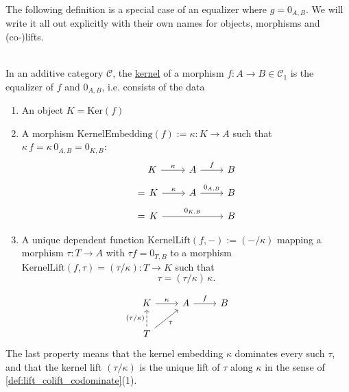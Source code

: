 The following definition is a special case of an equalizer where $g = 0_{A,B}$. We will write it all out explicitly with their
own names for objects, morphisms and (co-)lifts.

\begin{definition}[Kernel]\label{def:kernel}\phantom{}\\
In an additive category $\mathcal{C}$, the \ul{kernel} of a morphism $f : A \rightarrow B \in \mathcal{C}_{1}$ is the equalizer
of $f$ and $0_{A,B}$, i.e. consists of the data
\begin{enumerate}
\renewcommand{\labelenumi}{(\theenumi)}
\item An object $K = \mathrm{Ker}(f)$
\item A morphism $\mathrm{KernelEmbedding}(f) := \kappa : K \rightarrow A$ such that $\kappa\,f = \kappa\,0_{A,B} = 0_{K,B}$:
\begin{align*}
\begin{tikzcd}[
  ampersand replacement=\&,
  row sep=1em,
]
{\phantom{=\, }K} \arrow[r, "\kappa"]                 \& A \arrow[r, "f"] \& B \\
{=\, K} \arrow[r, "\kappa"]   \& A \arrow[r, "0_{A,B}"] \& B \\
{= \, K} \arrow[rr, "{0_{K,B}}"] \&                            \& B
\end{tikzcd}
\end{align*}
\item A unique dependent function $\mathrm{KernelLift}(f,-) := ( - /\kappa)$ mapping a morphism $\tau : T \rightarrow A$ with $\tau f = 0_{T,B}$ to a
morphism $\mathrm{KernelLift}(f,\tau) = (\tau / \kappa) : T \rightarrow K$ such that
\[
\tau = (\tau / \kappa)\, \kappa.
\]
\end{enumerate}
\[
\begin{tikzcd}
K \arrow[r, "\kappa"]                            & A \arrow[r, "f"] & B \\
T \arrow[ru, "\tau"'] \arrow[u, "(\tau/\kappa)", dashed] &                  &  
\end{tikzcd}
\]
The last property means that the kernel embedding $\kappa$ dominates every such $\tau$, and that the kernel lift
$(\tau/\kappa)$ is the unique lift of $\tau$ along $\kappa$ in the sense of \ref{def:lift_colift_codominate}(1).
\end{definition}

